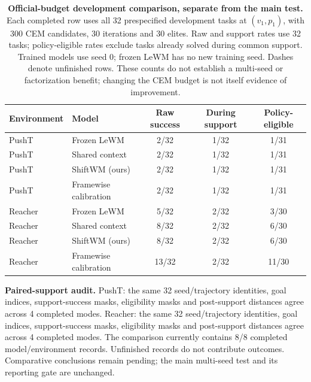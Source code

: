 \begin{table}[t]\centering\small
\begin{tabular}{llccc}\toprule
Environment & Model & Raw success & During support & Policy-eligible\\\midrule
PushT & Frozen LeWM & 2/32 & 1/32 & 1/31\\
PushT & Shared context & 2/32 & 1/32 & 1/31\\
PushT & ShiftWM (ours) & 2/32 & 1/32 & 1/31\\
PushT & Framewise calibration & 2/32 & 1/32 & 1/31\\
Reacher & Frozen LeWM & 5/32 & 2/32 & 3/30\\
Reacher & Shared context & 8/32 & 2/32 & 6/30\\
Reacher & ShiftWM (ours) & 8/32 & 2/32 & 6/30\\
Reacher & Framewise calibration & 13/32 & 2/32 & 11/30\\
\bottomrule\end{tabular}
\caption{\textbf{Official-budget development comparison, separate from the main test.} Each completed row uses all 32 prespecified development tasks at $(v_1,p_1)$, with 300 CEM candidates, 30 iterations and 30 elites. Raw and support rates use 32 tasks; policy-eligible rates exclude tasks already solved during common support. Trained models use seed 0; frozen LeWM has no new training seed. Dashes denote unfinished rows. These counts do not establish a multi-seed or factorization benefit; changing the CEM budget is not itself evidence of improvement.}
\label{tab:official-development}\end{table}
\noindent\textbf{Paired-support audit.} PushT: the same 32 seed/trajectory identities, goal indices, support-success masks, eligibility masks and post-support distances agree across 4 completed modes. Reacher: the same 32 seed/trajectory identities, goal indices, support-success masks, eligibility masks and post-support distances agree across 4 completed modes.
The comparison currently contains 8/8 completed model/environment records. Unfinished records do not contribute outcomes. Comparative conclusions remain pending; the main multi-seed test and its reporting gate are unchanged.

